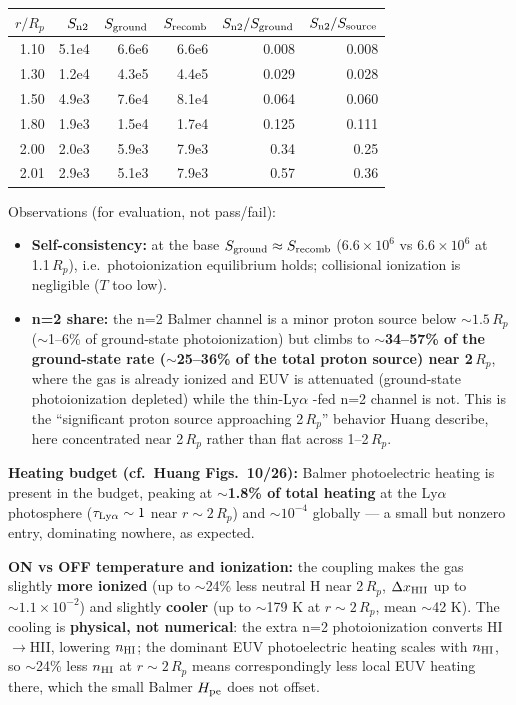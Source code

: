 \documentclass[english,a4paper]{kiseon_memo}
\begin{document}
\begin{center}
\begin{tabular}{rrrrrr}
\hline
$r/R_p$ & $S_{\rm n2}$ & $S_{\rm ground}$ & $S_{\rm recomb}$ &
  $S_{\rm n2}/S_{\rm ground}$ & $S_{\rm n2}/S_{\rm source}$ \\
\hline
1.10 & 5.1e4 & 6.6e6 & 6.6e6 & 0.008 & 0.008 \\
1.30 & 1.2e4 & 4.3e5 & 4.4e5 & 0.029 & 0.028 \\
1.50 & 4.9e3 & 7.6e4 & 8.1e4 & 0.064 & 0.060 \\
1.80 & 1.9e3 & 1.5e4 & 1.7e4 & 0.125 & 0.111 \\
2.00 & 2.0e3 & 5.9e3 & 7.9e3 & 0.34  & 0.25  \\
2.01 & 2.9e3 & 5.1e3 & 7.9e3 & 0.57  & 0.36  \\
\hline
\end{tabular}
\end{center}

Observations (for evaluation, not pass/fail):
\begin{itemize}
  \item \textbf{Self-consistency:} at the base \(S_{\rm ground}\approx S_{\rm
    recomb}\) (\(6.6\times10^6\) vs \(6.6\times10^6\) at 1.1\,\(R_p\)), i.e.\
    photoionization equilibrium holds; collisional ionization is negligible
    (\(T\) too low).
  \item \textbf{n=2 share:} the n=2 Balmer channel is a minor proton source below
    \(\sim1.5\,R_p\) (\(\sim\)1--6\% of ground-state photoionization) but climbs to
    \textbf{\(\sim\)34--57\% of the ground-state rate (\(\sim\)25--36\% of the
    total proton source) near 2\,\(R_p\)}, where the gas is already ionized and EUV
    is attenuated (ground-state photoionization depleted) while the thin-Ly\(\alpha\)%
    -fed n=2 channel is not. This is the ``significant proton source approaching
    2\,\(R_p\)'' behavior Huang describe, here concentrated near 2\,\(R_p\) rather
    than flat across 1--2\,\(R_p\).
\end{itemize}

\noindent\textbf{Heating budget (cf.\ Huang Figs.~10/26):} Balmer photoelectric
heating is present in the budget, peaking at \textbf{\(\sim\)1.8\% of total
heating} at the Ly\(\alpha\) photosphere (\(\tau_{{\rm Ly}\alpha}\sim1\) near
\(r\sim2\,R_p\)) and \(\sim10^{-4}\) globally --- a small but nonzero entry,
dominating nowhere, as expected.

\medskip\noindent\textbf{ON vs OFF temperature and ionization:} the coupling makes
the gas slightly \textbf{more ionized} (up to \(\sim\)24\% less neutral H near
2\,\(R_p\), \(\Delta x_{\rm HII}\) up to \(\sim1.1\times10^{-2}\)) and slightly
\textbf{cooler} (up to \(\sim\)179 K at \(r\sim2\,R_p\), mean \(\sim\)42 K). The
cooling is \textbf{physical, not numerical}: the extra n=2 photoionization converts
HI\(\to\)HII, lowering \(n_{\rm HI}\); the dominant EUV photoelectric heating scales
with \(n_{\rm HI}\), so \(\sim\)24\% less \(n_{\rm HI}\) at \(r\sim2\,R_p\) means
correspondingly less local EUV heating there, which the small Balmer \(H_{\rm pe}\)
does not offset.
\end{document}
